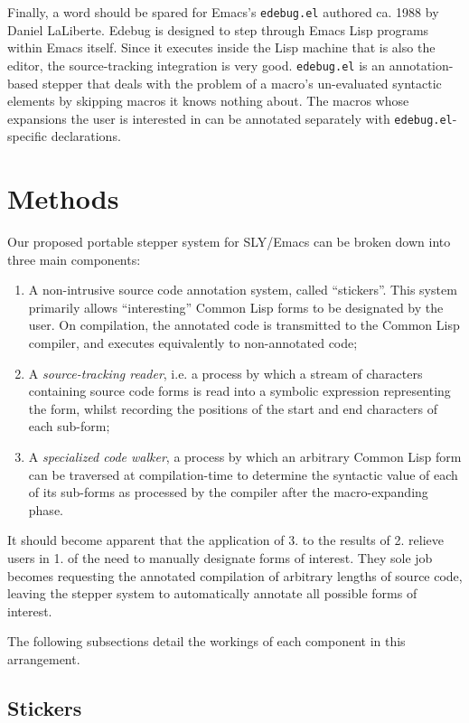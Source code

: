\documentclass[format=sigconf]{acmart}
\begin{document}
Finally, a word should be spared for Emacs's \texttt{edebug.el}
authored ca. 1988 by Daniel LaLiberte\cite{edebug}.  Edebug is
designed to step through Emacs Lisp programs within Emacs itself.
Since it executes inside the Lisp machine that is also the editor, the
source-tracking integration is very good.  \texttt{edebug.el} is an
annotation-based stepper that deals with the problem of a macro's
un-evaluated syntactic elements by skipping macros it knows nothing
about.  The macros whose expansions the user is interested in can be
annotated separately with \texttt{edebug.el}-specific declarations.

\section{Methods}

Our proposed portable stepper system for SLY/Emacs can be
broken down into three main components:

\begin{enumerate}
\item A non-intrusive source code annotation system, called
  ``stickers''. This system primarily allows ``interesting'' Common
  Lisp forms to be designated by the user.  On compilation, the
  annotated code is transmitted to the Common Lisp compiler, and
  executes equivalently to non-annotated code;
\item A \emph{source-tracking reader}, i.e. a process by which a
  stream of characters containing source code forms is read into a
  symbolic expression representing the form, whilst recording the
  positions of the start and end characters of each sub-form;
\item A \emph{specialized code walker}, a process by which an
  arbitrary Common Lisp form can be traversed at compilation-time to
  determine the syntactic value of each of its sub-forms as processed
  by the compiler after the macro-expanding phase.
\end{enumerate}

It should become apparent that the application of 3. to the results of
2. relieve users in 1. of the need to manually designate forms of
interest.  They sole job becomes requesting the annotated compilation
of arbitrary lengths of source code, leaving the stepper system to
automatically annotate all possible forms of interest.

The following subsections detail the workings of each component in
this arrangement.

\subsection{Stickers}\label{stickers}
\end{document}

